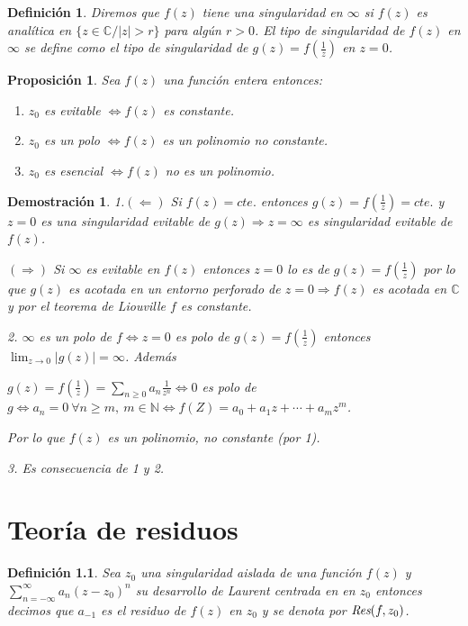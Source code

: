 \documentclass[10pt]{book}
\newtheorem{defi}{Definición}[chapter]
\newtheorem{prop}{Proposición}[chapter]
\newtheorem*{dem}{Demostración}
\newcommand{\C}{\mathbb{C}}
\newcommand{\N}{\mathbb{N}}
\newcommand{\Res}{\emph{Res}}
\begin{document}
\begin{defi}
Diremos que $f(z)$ tiene una singularidad en $\infty$ si $f(z)$ es analítica en $\{z\in\C / |z|>r\}$ para algún $r>0$.
El tipo de singularidad de $f(z)$ en $\infty$ se define como el tipo de singularidad de $g(z) = f\left(\frac{1}{z}\right)$ en $z=0$.
\end{defi}

\begin{prop}
Sea $f(z)$ una función entera entonces:
\begin{enumerate}
\item $z_0$ es evitable $\Leftrightarrow f(z)$ es constante.
\item $z_0$ es un polo $\Leftrightarrow f(z)$ es un polinomio no constante.
\item $z_0$ es esencial $\Leftrightarrow f(z)$ no es un polinomio.
\end{enumerate}
\end{prop}

\begin{dem}
1.$(\Leftarrow)$ Si $f(z) = cte.$ entonces $g(z) = f\left(\frac{1}{z}\right)= cte.$ y $z=0$ es una singularidad evitable de $g(z)\Rightarrow z=\infty$ es singularidad evitable de $f(z)$.

$(\Rightarrow)$ Si $\infty$ es evitable en $f(z)$ entonces $z=0$ lo es de $g(z) = f\left(\frac{1}{z}\right)$ por lo que $g(z)$ es acotada en un entorno perforado de $z=0 \Rightarrow f(z)$ es acotada en $\C$ y por el teorema de Liouville $f$ es constante.

2. $\infty$ es un polo de $f\Leftrightarrow z=0$ es polo de $g(z) = f\left(\frac{1}{z}\right)$ entonces $\lim_{z\to 0}|g(z)| = \infty$. Además

$g(z) = f\left(\frac{1}{z}\right) = \sum_{n\geq 0} a_n \frac{1}{z^n}\Leftrightarrow 0$ es polo de $g \Leftrightarrow a_n=0\ \forall n\geq m,\ m\in\N\Leftrightarrow f(Z) = a_0 + a_1z + \cdots + a_mz^m$.

 Por lo que $f(z)$ es un polinomio, no constante (por 1).

3. Es consecuencia de 1 y 2. 
\end{dem}


\chapter{Teoría de residuos}

\begin{defi}
Sea $z_0$ una singularidad aislada de una función $f(z)$ y $\displaystyle \sum_{n=-\infty}^{\infty} a_n (z-z_0)^n$ su desarrollo de Laurent centrada en en $z_0$ entonces decimos que $a_{-1}$ es el residuo de $f(z)$ en $z_0$ y se denota por $\Res(f,z_0)$.
\end{defi}
\end{document}
